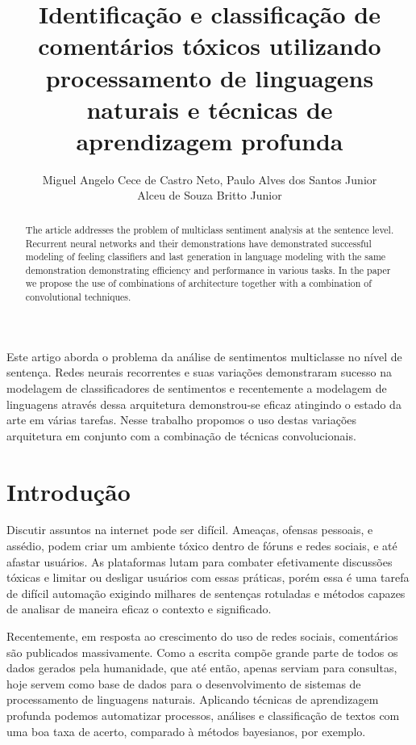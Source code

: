 \documentclass[12pt]{article}
\title{Identificação e classificação de comentários tóxicos utilizando processamento de linguagens naturais e técnicas de aprendizagem profunda}
\author{
    Miguel Angelo Cece de Castro Neto\inst{1},
    Paulo Alves dos Santos Junior\inst{1}\\
    Alceu de Souza Britto Junior\inst{2}
}
\begin{document}
\maketitle

\begin{abstract}
  The article addresses the problem of multiclass sentiment analysis at the sentence level. Recurrent neural networks and their demonstrations have demonstrated successful modeling of feeling classifiers and last generation in language modeling with the same demonstration demonstrating efficiency and performance in various tasks. In the paper we propose the use of combinations of architecture together with a combination of convolutional techniques.
\end{abstract}

\begin{resumo}
  Este artigo aborda o problema da análise de sentimentos multiclasse no nível de sentença. Redes neurais recorrentes e suas variações demonstraram sucesso na modelagem de classificadores de sentimentos e recentemente a modelagem de linguagens através dessa arquitetura demonstrou-se eficaz atingindo o estado da arte em várias tarefas. Nesse trabalho propomos o uso destas variações arquitetura em conjunto com a combinação de técnicas convolucionais.
\end{resumo}


\section{Introdução} \label{sec:introducao}

Discutir assuntos na internet pode ser difícil. Ameaças, ofensas pessoais, e assédio, podem criar um ambiente tóxico dentro de fóruns e redes sociais, e até afastar usuários. As plataformas lutam para combater efetivamente discussões tóxicas e limitar ou desligar usuários com essas práticas, porém essa é uma tarefa de difícil automação exigindo milhares de sentenças rotuladas e métodos capazes de analisar de maneira eficaz o contexto e significado.

Recentemente, em resposta ao crescimento do uso de redes sociais, comentários são publicados massivamente. Como a escrita compõe grande parte de todos os dados gerados pela humanidade, que até então, apenas serviam para consultas, hoje servem como base de dados para o desenvolvimento de sistemas de processamento de linguagens naturais. Aplicando técnicas de aprendizagem profunda podemos automatizar processos, análises e classificação de textos com uma boa taxa de acerto, comparado à métodos bayesianos, por exemplo.
\end{document}
